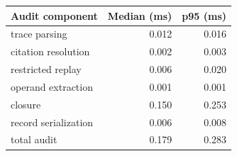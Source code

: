\begin{tabular}{lrr}
\toprule
Audit component & Median (ms) & p95 (ms) \\
\midrule
trace parsing & 0.012 & 0.016 \\
citation resolution & 0.002 & 0.003 \\
restricted replay & 0.006 & 0.020 \\
operand extraction & 0.001 & 0.001 \\
closure & 0.150 & 0.253 \\
record serialization & 0.006 & 0.008 \\
total audit & 0.179 & 0.283 \\
\bottomrule
\end{tabular}
